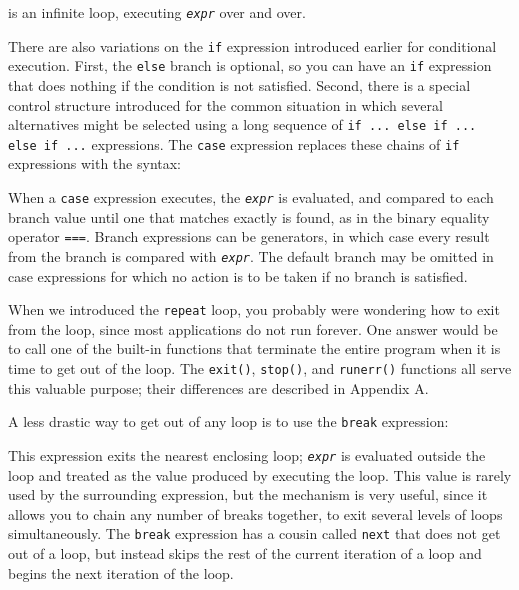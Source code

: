 
\noindent is an infinite loop, executing \texttt{\textit{expr}}
over and over.

There are also variations on the \texttt{if} expression introduced
earlier for conditional execution. First, the \texttt{else} branch is
optional, so you can have an \texttt{if} expression that does nothing
if the condition is not satisfied. Second, there is a special control
structure introduced for the common situation in which several
alternatives might be selected using a long sequence of \texttt{if ...
else if ... else if ...} expressions. The  \texttt{case}
expression replaces these chains of \texttt{if} expressions with the syntax:


When a \texttt{case} expression executes, the \texttt{\textit{expr}} is
evaluated, and compared to each branch value until one that matches
exactly is found, as in the binary equality operator \texttt{===}.
Branch expressions can be generators, in which case every result from
the branch is compared with \texttt{\textit{expr}}. The default branch
may be omitted in case expressions for which no action is to be taken
if no branch is satisfied.

When we introduced the \texttt{repeat} loop, you probably were
wondering how to exit from the loop, since most applications do not
run forever.  One answer would be to call one of the built-in
functions that terminate the entire program when it is time to get out
of the loop.  The \texttt{exit()}, \texttt{stop()}, and
\texttt{runerr()} functions all serve this valuable purpose; their
differences are described in Appendix A.

A less drastic way to get out of any loop is to use the
\texttt{break} expression:


This expression exits the nearest enclosing loop; \texttt{\textit{expr}}
is evaluated outside the loop and treated as the value produced by
executing the loop. This value is rarely used by the surrounding
expression, but the mechanism is very useful, since it allows you to
chain any number of breaks together, to exit several levels of loops
simultaneously. The \texttt{break} expression has a cousin called
\texttt{next} that does not get out of a loop, but instead skips the
rest of the current iteration of a loop and begins the next iteration
of the loop.


